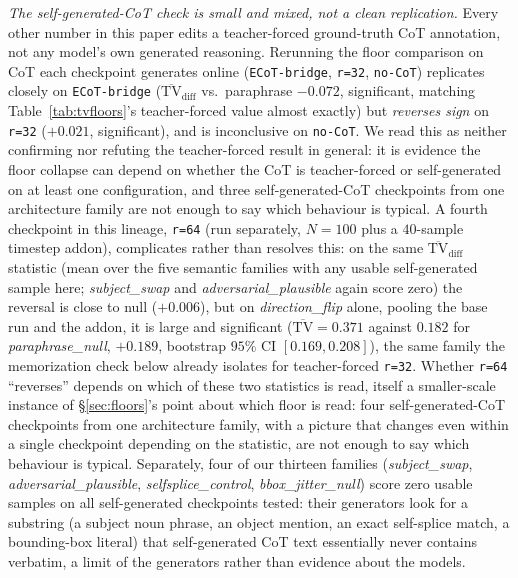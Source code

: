 \emph{The self-generated-CoT check is small and mixed, not a clean replication.} Every other number in this paper edits a teacher-forced ground-truth CoT annotation, not any model's own generated reasoning. Rerunning the floor comparison on CoT each checkpoint generates online (\texttt{ECoT-bridge}, \texttt{r=32}, \texttt{no-CoT}) replicates closely on \texttt{ECoT-bridge} ($\overline{\text{TV}}_{\text{diff}}$ vs.\ paraphrase $-0.072$, significant, matching Table~\ref{tab:tvfloors}'s teacher-forced value almost exactly) but \emph{reverses sign} on \texttt{r=32} ($+0.021$, significant), and is inconclusive on \texttt{no-CoT}. We read this as neither confirming nor refuting the teacher-forced result in general: it is evidence the floor collapse can depend on whether the CoT is teacher-forced or self-generated on at least one configuration, and three self-generated-CoT checkpoints from one architecture family are not enough to say which behaviour is typical. A fourth checkpoint in this lineage, \texttt{r=64} (run separately, $N{=}100$ plus a $40$-sample timestep addon), complicates rather than resolves this: on the same $\overline{\text{TV}}_{\text{diff}}$ statistic (mean over the five semantic families with any usable self-generated sample here; \emph{subject\_swap} and \emph{adversarial\_plausible} again score zero) the reversal is close to null ($+0.006$), but on \emph{direction\_flip} alone, pooling the base run and the addon, it is large and significant ($\overline{\text{TV}} = 0.371$ against $0.182$ for \emph{paraphrase\_null}, $+0.189$, bootstrap $95\%$ CI $[0.169, 0.208]$), the same family the memorization check below already isolates for teacher-forced \texttt{r=32}. Whether \texttt{r=64} ``reverses'' depends on which of these two statistics is read, itself a smaller-scale instance of \S\ref{sec:floors}'s point about which floor is read: four self-generated-CoT checkpoints from one architecture family, with a picture that changes even within a single checkpoint depending on the statistic, are not enough to say which behaviour is typical. Separately, four of our thirteen families (\emph{subject\_swap}, \emph{adversarial\_plausible}, \emph{selfsplice\_control}, \emph{bbox\_jitter\_null}) score zero usable samples on all self-generated checkpoints tested: their generators look for a substring (a subject noun phrase, an object mention, an exact self-splice match, a bounding-box literal) that self-generated CoT text essentially never contains verbatim, a limit of the generators rather than evidence about the models.

